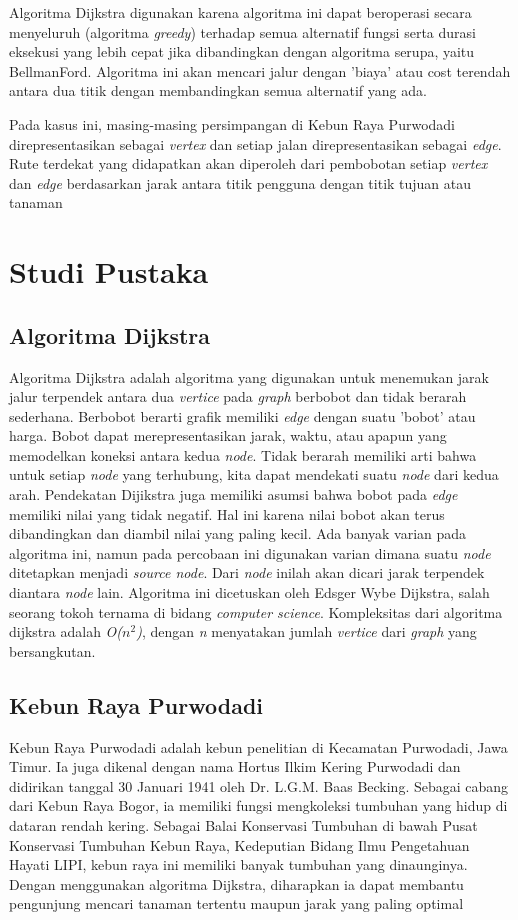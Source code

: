 \documentclass[conference]{IEEEtran}
\begin{document}
Algoritma Dijkstra digunakan karena algoritma ini dapat beroperasi secara menyeluruh (algoritma \textit{greedy}) terhadap semua alternatif fungsi serta durasi eksekusi yang lebih cepat jika dibandingkan dengan algoritma serupa, yaitu BellmanFord. Algoritma ini akan mencari jalur dengan ’biaya’ atau cost terendah antara dua titik dengan membandingkan semua alternatif yang ada.

Pada kasus ini, masing-masing persimpangan di Kebun Raya Purwodadi direpresentasikan sebagai \textit{vertex} dan setiap jalan direpresentasikan sebagai \textit{edge}. Rute terdekat yang didapatkan akan diperoleh dari pembobotan setiap  \textit{vertex} dan  \textit{edge} berdasarkan jarak antara titik pengguna dengan titik tujuan atau tanaman

\section{Studi Pustaka}
\subsection{Algoritma Dijkstra}
Algoritma Dijkstra adalah algoritma yang digunakan untuk menemukan jarak jalur terpendek antara dua  \textit{vertice} pada  \textit{graph} berbobot dan tidak berarah sederhana. Berbobot berarti graﬁk memiliki  \textit{edge} dengan suatu ’bobot’ atau harga. Bobot dapat merepresentasikan jarak, waktu, atau apapun yang memodelkan koneksi antara kedua  \textit{node}. Tidak berarah memiliki arti bahwa untuk setiap  \textit{node} yang terhubung, kita dapat mendekati suatu  \textit{node} dari kedua arah. Pendekatan Dijikstra juga memiliki asumsi bahwa bobot pada  \textit{edge} memiliki nilai yang tidak negatif. Hal ini karena nilai bobot akan terus dibandingkan dan diambil nilai yang paling kecil. Ada banyak varian pada algoritma ini, namun pada percobaan ini digunakan varian dimana suatu  \textit{node} ditetapkan menjadi  \textit{source node}. Dari  \textit{node} inilah akan dicari jarak terpendek diantara  \textit{node} lain. Algoritma ini dicetuskan oleh Edsger Wybe Dijkstra, salah seorang tokoh ternama di bidang  \textit{computer science}. Kompleksitas dari algoritma dijkstra adalah  \textit{O($n^2$)}, dengan \textit{n} menyatakan jumlah  \textit{vertice} dari  \textit{graph} yang bersangkutan.

\subsection{Kebun Raya Purwodadi}
Kebun Raya Purwodadi adalah kebun penelitian di Kecamatan Purwodadi, Jawa Timur. Ia juga dikenal dengan nama Hortus Ilkim Kering Purwodadi dan didirikan tanggal 30 Januari 1941 oleh Dr. L.G.M. Baas Becking. Sebagai cabang dari Kebun Raya Bogor, ia memiliki fungsi mengkoleksi tumbuhan yang hidup di dataran rendah kering. Sebagai Balai Konservasi Tumbuhan di bawah Pusat Konservasi Tumbuhan Kebun Raya, Kedeputian Bidang Ilmu Pengetahuan Hayati LIPI, kebun raya ini memiliki banyak tumbuhan yang dinaunginya. Dengan menggunakan algoritma Dijkstra, diharapkan ia dapat membantu pengunjung mencari tanaman tertentu maupun jarak yang paling optimal
\end{document}
